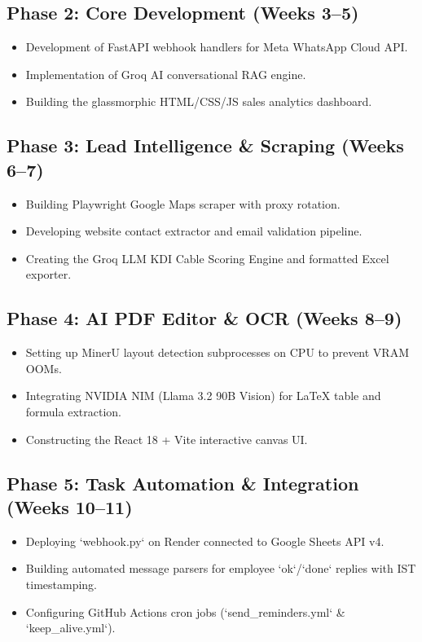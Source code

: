 \documentclass[12pt,a4paper]{report}
\begin{document}
\subsection{Phase 2: Core Development (Weeks 3--5)}
\begin{itemize}[leftmargin=*,itemsep=2pt]
    \item Development of FastAPI webhook handlers for Meta WhatsApp Cloud API.
    \item Implementation of Groq AI conversational RAG engine.
    \item Building the glassmorphic HTML/CSS/JS sales analytics dashboard.
\end{itemize}

\subsection{Phase 3: Lead Intelligence & Scraping (Weeks 6--7)}
\begin{itemize}[leftmargin=*,itemsep=2pt]
    \item Building Playwright Google Maps scraper with proxy rotation.
    \item Developing website contact extractor and email validation pipeline.
    \item Creating the Groq LLM KDI Cable Scoring Engine and formatted Excel exporter.
\end{itemize}

\subsection{Phase 4: AI PDF Editor & OCR (Weeks 8--9)}
\begin{itemize}[leftmargin=*,itemsep=2pt]
    \item Setting up MinerU layout detection subprocesses on CPU to prevent VRAM OOMs.
    \item Integrating NVIDIA NIM (Llama 3.2 90B Vision) for LaTeX table and formula extraction.
    \item Constructing the React 18 + Vite interactive canvas UI.
\end{itemize}

\subsection{Phase 5: Task Automation & Integration (Weeks 10--11)}
\begin{itemize}[leftmargin=*,itemsep=2pt]
    \item Deploying `webhook.py` on Render connected to Google Sheets API v4.
    \item Building automated message parsers for employee `ok`/`done` replies with IST timestamping.
    \item Configuring GitHub Actions cron jobs (`send_reminders.yml` & `keep_alive.yml`).
\end{itemize}
\end{document}
